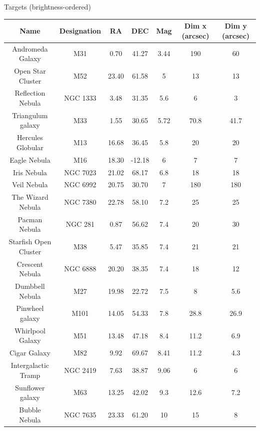 \documentclass[11pt, aspectratio=169]{beamer}
\begin{document}
\begin{frame}[t]{Targets (brightness-ordered)}
\begin{table}[]
\tiny
\begin{tabular}{|c|c|c|c|c|c|c|}
\hline
\textbf{Name}                  & \textbf{Designation} & \textbf{RA}    & \textbf{DEC}    & \textbf{Mag}  & \textbf{Dim x (arcsec)} & \textbf{Dim y (arcsec)} \\ \hline
Andromeda Galaxy      & M31         & 0.70  & 41.27  & 3.44 & 190   & 60    \\ \hline
Open Star Cluster     & M52         & 23.40 & 61.58  & 5    & 13    & 13    \\ \hline
Reflection Nebula     & NGC 1333    & 3.48  & 31.35  & 5.6  & 6     & 3     \\ \hline
Triangulum galaxy     & M33         & 1.55  & 30.65  & 5.72 & 70.8  & 41.7  \\ \hline
Hercules Globular     & M13         & 16.68 & 36.45  & 5.8  & 20    & 20    \\ \hline
Eagle Nebula          & M16         & 18.30 & -12.18 & 6    & 7     & 7     \\ \hline
Iris Nebula           & NGC 7023    & 21.02 & 68.17  & 6.8  & 18    & 18    \\ \hline
Veil Nebula           & NGC 6992    & 20.75 & 30.70  & 7    & 180   & 180   \\ \hline
The Wizard Nebula     & NGC 7380    & 22.78 & 58.10  & 7.2  & 25    & 25    \\ \hline
Pacman Nebula         & NGC 281     & 0.87  & 56.62  & 7.4  & 20    & 30    \\ \hline
Starfish Open Cluster & M38         & 5.47  & 35.85  & 7.4  & 21    & 21    \\ \hline
Crescent Nebula       & NGC 6888    & 20.20 & 38.35  & 7.4  & 18    & 12    \\ \hline
Dumbbell Nebula       & M27         & 19.98 & 22.72  & 7.5  & 8     & 5.6   \\ \hline
Pinwheel galaxy       & M101        & 14.05 & 54.33  & 7.8  & 28.8  & 26.9  \\ \hline
Whirlpool Galaxy      & M51         & 13.48 & 47.18  & 8.4  & 11.2  & 6.9   \\ \hline
Cigar Galaxy          & M82         & 9.92  & 69.67  & 8.41 & 11.2  & 4.3   \\ \hline
Intergalactic Tramp   & NGC 2419    & 7.63  & 38.87  & 9.06 & 6     & 6     \\ \hline
Sunflower galaxy      & M63         & 13.25 & 42.02  & 9.3  & 12.6  & 7.2   \\ \hline
Bubble Nebula         & NGC 7635    & 23.33 & 61.20  & 10   & 15    & 8     \\ \hline
\end{tabular}
\end{table}
\end{frame}
\end{document}
